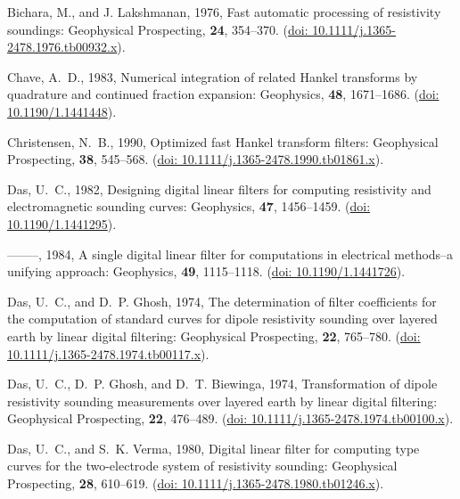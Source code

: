 \documentclass[paper,twocolumn,twoside]{geophysics}
\begin{document}
\begin{thebibliography}{}
Bichara, M., and J. Lakshmanan,  1976, Fast automatic processing of resistivity
soundings\old{*}: Geophysical Prospecting, {\bf 24}, 354--370.
\newblock (\href{https://doi.org/10.1111/j.1365-2478.1976.tb00932.x}{doi:
  10.1111/j.1365-2478.1976.tb00932.x}).

Chave, A.~D.,  1983, Numerical integration of related {H}ankel transforms by
  quadrature and continued fraction expansion: Geophysics, {\bf 48},
  1671--1686.
\newblock (\href{https://doi.org/10.1190/1.1441448}{doi: 10.1190/1.1441448}).

Christensen, N.~B.,  1990, Optimized fast {H}ankel transform filters:
  Geophysical Prospecting, {\bf 38}, 545--568.
\newblock (\href{https://doi.org/10.1111/j.1365-2478.1990.tb01861.x}{doi:
  10.1111/j.1365-2478.1990.tb01861.x}).

Das, U.~C.,  1982, Designing digital linear filters for computing resistivity
  and electromagnetic sounding curves: Geophysics, {\bf 47}, 1456--1459.
\newblock (\href{https://doi.org/10.1190/1.1441295}{doi: 10.1190/1.1441295}).

--------, 1984, A single digital linear filter for computations in electrical
  methods--a unifying approach: Geophysics, {\bf 49}, 1115--1118.
\newblock (\href{https://doi.org/10.1190/1.1441726}{doi: 10.1190/1.1441726}).

Das, U.~C., and D.~P. Ghosh,  1974, The determination of filter coefficients
  for the computation of standard curves for dipole resistivity sounding over
  layered earth by linear digital filtering: Geophysical Prospecting, {\bf 22},
  765--780.
\newblock (\href{https://doi.org/10.1111/j.1365-2478.1974.tb00117.x}{doi:
  10.1111/j.1365-2478.1974.tb00117.x}).

Das, U.~C., D.~P. Ghosh, and D.~T. Biewinga,  1974, Transformation of dipole
  resistivity sounding measurements over layered earth by linear digital
  filtering: Geophysical Prospecting, {\bf 22}, 476--489.
\newblock (\href{https://doi.org/10.1111/j.1365-2478.1974.tb00100.x}{doi:
  10.1111/j.1365-2478.1974.tb00100.x}).

Das, U.~C., and S.~K. Verma,  1980, Digital linear filter for computing type
  curves for the two-electrode system of resistivity sounding: Geophysical
  Prospecting, {\bf 28}, 610--619.
\newblock (\href{https://doi.org/10.1111/j.1365-2478.1980.tb01246.x}{doi:
  10.1111/j.1365-2478.1980.tb01246.x}).


\end{thebibliography}
\end{document}
